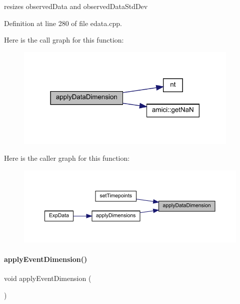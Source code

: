 resizes observed\+Data and observed\+Data\+Std\+Dev 

Definition at line 280 of file edata.\+cpp.

Here is the call graph for this function\+:
\nopagebreak
\begin{figure}[H]
\begin{center}
\leavevmode
\includegraphics[width=303pt]{classamici_1_1_exp_data_ae0f51d05d7fbaf7f61e0795301bad084_cgraph}
\end{center}
\end{figure}
Here is the caller graph for this function\+:
\nopagebreak
\begin{figure}[H]
\begin{center}
\leavevmode
\includegraphics[width=350pt]{classamici_1_1_exp_data_ae0f51d05d7fbaf7f61e0795301bad084_icgraph}
\end{center}
\end{figure}
\mbox{\label{classamici_1_1_exp_data_ae872e294aa6f34e90844905fd203eb16}} 
\paragraph{\texorpdfstring{applyEventDimension()}{applyEventDimension()}}
{\footnotesize\ttfamily void apply\+Event\+Dimension (\begin{DoxyParamCaption}{ }\end{DoxyParamCaption})\hspace{0.3cm}{\ttfamily [protected]}}

